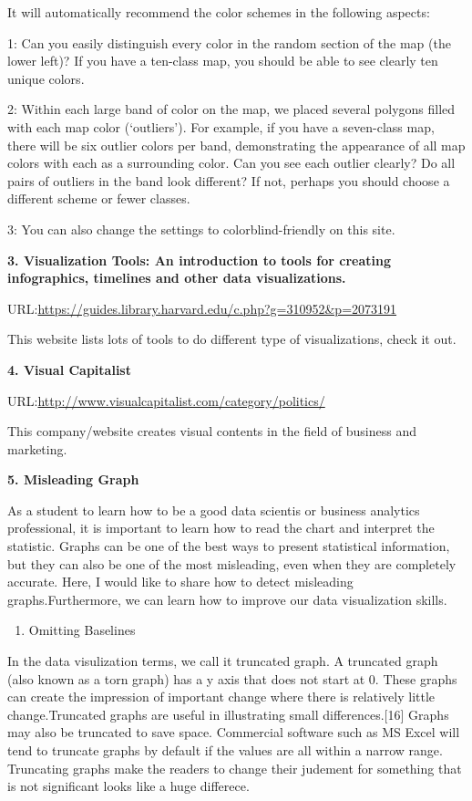 \documentclass[]{book}
\providecommand{\tightlist}{%
  \setlength{\itemsep}{0pt}\setlength{\parskip}{0pt}}
\theoremstyle{definition}
\theoremstyle{definition}
\theoremstyle{definition}
\theoremstyle{remark}
\begin{document}
It will automatically recommend the color schemes in the following
aspects:

1: Can you easily distinguish every color in the random section of the
map (the lower left)? If you have a ten-class map, you should be able to
see clearly ten unique colors.

2: Within each large band of color on the map, we placed several
polygons filled with each map color (`outliers'). For example, if you
have a seven-class map, there will be six outlier colors per band,
demonstrating the appearance of all map colors with each as a
surrounding color. Can you see each outlier clearly? Do all pairs of
outliers in the band look different? If not, perhaps you should choose a
different scheme or fewer classes.

3: You can also change the settings to colorblind-friendly on this site.

\textbf{3. Visualization Tools: An introduction to tools for creating
infographics, timelines and other data visualizations.}

URL:\url{https://guides.library.harvard.edu/c.php?g=310952\&p=2073191}

This website lists lots of tools to do different type of visualizations,
check it out.

\textbf{4. Visual Capitalist}

URL:\url{http://www.visualcapitalist.com/category/politics/}

This company/website creates visual contents in the field of business
and marketing.

\textbf{5. Misleading Graph}

As a student to learn how to be a good data scientis or business
analytics professional, it is important to learn how to read the chart
and interpret the statistic. Graphs can be one of the best ways to
present statistical information, but they can also be one of the most
misleading, even when they are completely accurate. Here, I would like
to share how to detect misleading graphs.Furthermore, we can learn how
to improve our data visualization skills.

\begin{enumerate}
\def\labelenumi{\arabic{enumi}.}
\tightlist
\item
  Omitting Baselines
\end{enumerate}

In the data visulization terms, we call it truncated graph. A truncated
graph (also known as a torn graph) has a y axis that does not start at
0. These graphs can create the impression of important change where
there is relatively little change.Truncated graphs are useful in
illustrating small differences.{[}16{]} Graphs may also be truncated to
save space. Commercial software such as MS Excel will tend to truncate
graphs by default if the values are all within a narrow range.
Truncating graphs make the readers to change their judement for
something that is not significant looks like a huge differece.
\end{document}
